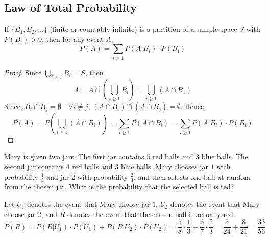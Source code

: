 \subsection{Law of Total Probability}
\begin{theorem}
    If $\lbrace B_1, B_2, \dots \rbrace$ (finite or countably infinite) is a
partition of a sample space $S$ with $P(B_i) > 0$, then for any event $A$,
\begin{equation*}
    P(A) = \sum_{i \geq 1} P(A \vert B_i) \cdot P(B_i)
\end{equation*}
\end{theorem}
\begin{proof}
    Since $\bigcup_{i \geq 1} B_i = S$, then 
    \begin{equation*}
        A = A \cap (\bigcup_{i \geq 1} B_i)
          = \bigcup_{i \geq 1} (A \cap B_1)
    \end{equation*}
    Since, $B_i \cap B_j = \emptyset \quad \forall i \neq j$, $(A \cap B_i)
\cap (A \cap B_j) = \emptyset$. Hence,
    \begin{equation*}
        P(A) = P(\bigcup_{i \geq 1} (A \cap B_i))
             = \sum_{i \geq 1} P(A \cap B_i)
             = \sum_{i \geq 1} P(A \vert B_i) \cdot P(B_i)
    \end{equation*}
\end{proof}

\begin{example}
    Mary is given two jars. The first jar contains $5$ red balls and $3$ blue
balls. The second jar contains $4$ red balls and $3$ blue balls. Mary chooses
jar $1$ with probability $\frac{1}{3}$ and jar $2$ with probability
$\frac{2}{3}$, and then selects one ball at random from the chosen jar. What is
the probability that the selected ball is red?
\end{example}
\begin{solution}
    Let $U_1$ denotes the event that Mary choose jar $1$, $U_2$ denotes the
event that Mary choose jar $2$, and $R$ denotes the event that the chosen ball
is actually red.
\begin{equation*}
    P(R) = P(R \vert U_1) \cdot P(U_1) + P(R \vert U_2) \cdot P(U_2)        
         = \frac{5}{8} \cdot \frac{1}{3} + \frac{6}{7} \cdot \frac{2}{3}    
         = \frac{5}{24} + \frac{8}{21}
         = \frac{33}{56}
\end{equation*}
\end{solution}

